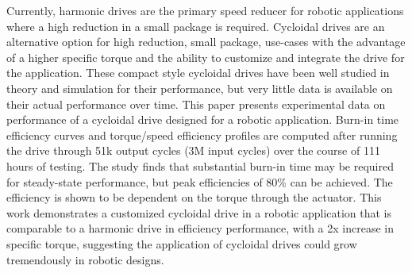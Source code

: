 Currently, harmonic drives are the primary speed reducer for robotic applications where a high reduction in a small package is required.
Cycloidal drives are an alternative option for high reduction, small package, use-cases with the advantage of a higher specific torque and the ability to customize and integrate the drive for the application.
These compact style cycloidal drives have been well studied in theory and simulation for their performance, but very little data is available on their actual performance over time.
This paper presents experimental data on performance of a cycloidal drive designed for a robotic application.
Burn-in time efficiency curves and torque/speed efficiency profiles are computed after running the drive through 51k output cycles (3M input cycles) over the course of 111 hours of testing.
The study finds that substantial burn-in time may be required for steady-state performance, but peak efficiencies of 80\% can be achieved.
The efficiency is shown to be dependent on the torque through the actuator.
This work demonstrates a customized cycloidal drive in a robotic application that is comparable to a harmonic drive in efficiency performance, with a 2x increase in specific torque, suggesting the application of cycloidal drives could grow tremendously in robotic designs.
